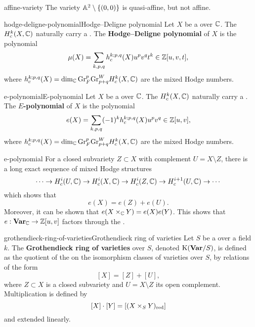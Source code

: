 \begin{example}{affine-variety}
    The variety $\AA^2 \setminus \{ (0, 0) \}$ is quasi-affine, but not affine.
\end{example}

\begin{topic}{hodge-deligne-polynomial}{Hodge--Deligne polynomial}
    Let $X$ be a  over $\CC$. The  $H_c^k(X, \CC)$ naturally carry a . The \textbf{Hodge--Deligne polynomial} of $X$ is the polynomial
    \[ \mu(X) = \sum_{k, p, q} h_c^{k; p, q}(X) u^p v^q t^k \in \ZZ[u, v, t] , \]
    where $h_c^{k; p, q}(X) = \dim_\CC \textup{Gr}_F^p \textup{Gr}^W_{p + q} H_c^k(X, \CC)$ are the mixed Hodge numbers.
\end{topic}

\begin{topic}{e-polynomial}{E-polynomial}
    Let $X$ be a  over $\CC$. The  $H_c^k(X, \CC)$ naturally carry a . The \textbf{$E$-polynomial} of $X$ is the polynomial
    \[ e(X) = \sum_{k, p, q} (-1)^k h_c^{k; p, q}(X) u^p v^q \in \ZZ[u, v] , \]
    where $h_c^{k; p, q}(X) = \dim_\CC \textup{Gr}_F^p \textup{Gr}^W_{p + q} H_c^k(X, \CC)$ are the mixed Hodge numbers.
\end{topic}

\begin{example}{e-polynomial}
    For a closed subvariety $Z \subset X$ with complement $U = X \setminus Z$, there is a long exact sequence of mixed Hodge structures
    \[ \cdots \to H_c^i(U, \CC) \to H_c^i(X, \CC) \to H_c^i(Z, \CC) \to H_c^{i + 1}(U, \CC) \to \cdots \]
    which shows that
    \[ e(X) = e(Z) + e(U) . \]
    Moreover, it can be shown that $e(X \times_\CC Y) = e(X) e(Y)$. This shows that $e : \textbf{Var}_\CC \to \ZZ[u, v]$ factors through the .
\end{example}

\begin{topic}{grothendieck-ring-of-varieties}{Grothendieck ring of varieties}
    Let $S$ be a  over a field $k$. The \textbf{Grothendieck ring of varieties} over $S$, denoted $\textup{K}(\textbf{Var}/S)$, is defined as the quotient of the  on the isomorphism classes of varieties over $S$, by relations of the form
    \[ [X] = [Z] + [U] , \]
    where $Z \subset X$ is a closed subvariety and $U = X \setminus Z$ its open complement. Multiplication is defined by
    \[ [X] \cdot [Y] = [(X \times_S Y)_\textup{red}] \]
    and extended linearly.
\end{topic}

